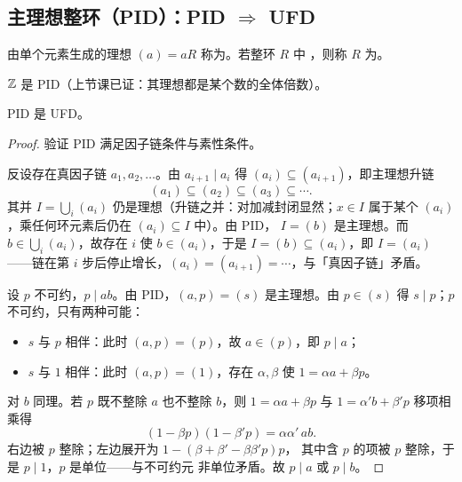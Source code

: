\subsection{主理想整环（PID）：PID \texorpdfstring{$\Rightarrow$}{=>} UFD}

\begin{definition}
由单个元素生成的理想 $(a) = aR$ 称为。若整环 $R$ 中
，则称 $R$ 为。
\end{definition}

\begin{example}
$\mathbb{Z}$ 是 PID（上节课已证：其理想都是某个数的全体倍数）。
\end{example}

\begin{theorem}
PID 是 UFD。
\end{theorem}

\begin{proof}
验证 PID 满足因子链条件与素性条件。

反设存在真因子链 $a_1, a_2, \dots$。由
$a_{i+1}\mid a_i$ 得 $(a_i)\subseteq(a_{i+1})$，即主理想升链
\[
  (a_1)\subseteq(a_2)\subseteq(a_3)\subseteq\cdots.
\]
其并 $I = \bigcup_i (a_i)$ 仍是理想（升链之并：对加减封闭显然；$x\in I$
属于某个 $(a_i)$，乘任何环元素后仍在 $(a_i)\subseteq I$ 中）。由 PID，
$I = (b)$ 是主理想。而 $b\in\bigcup_i(a_i)$，故存在 $i$ 使
$b\in(a_i)$，于是 $I = (b)\subseteq(a_i)$，即 $I = (a_i)$——链在第
$i$ 步后停止增长，$(a_i) = (a_{i+1}) = \cdots$，与「真因子链」矛盾。

设 $p$ 不可约，$p\mid ab$。由 PID，$(a,p) = (s)$
是主理想。由 $p\in(s)$ 得 $s\mid p$；$p$ 不可约，只有两种可能：
\begin{itemize}[leftmargin=1.3em,itemsep=2pt]
  \item $s$ 与 $p$ 相伴：此时 $(a,p) = (p)$，故 $a\in(p)$，即 $p\mid a$；
  \item $s$ 与 $1$ 相伴：此时 $(a,p) = (1)$，存在 $\alpha,\beta$ 使
        $1 = \alpha a + \beta p$。
\end{itemize}
对 $b$ 同理。若 $p$ 既不整除 $a$ 也不整除 $b$，则
$1 = \alpha a + \beta p$ 与 $1 = \alpha' b + \beta' p$ 移项相乘得
\[
  (1-\beta p)(1-\beta' p) = \alpha\alpha'\, ab.
\]
右边被 $p$ 整除；左边展开为 $1 - (\beta + \beta' - \beta\beta' p)p$，
其中含 $p$ 的项被 $p$ 整除，于是 $p\mid 1$，$p$ 是单位——与不可约元
非单位矛盾。故 $p\mid a$ 或 $p\mid b$。
\end{proof}


